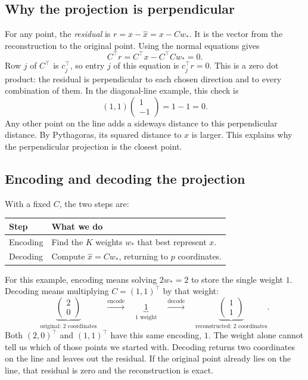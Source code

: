 \documentclass[a4paper,12pt,oneside]{report}
\begin{document}
\subsection{Why the projection is perpendicular}

For any point, the \emph{residual} is $r=x-\hat{x}=x-Cw_*$.
It is the vector from the reconstruction to the original point.
Using the normal equations gives
\[
  C^\top r=C^\top x-C^\top Cw_*=0.
\]
Row $j$ of $C^\top$ is $c_j^\top$, so entry $j$ of this equation is
$c_j^\top r=0$. This is a zero dot product: the residual is perpendicular
to each chosen direction and to every combination of them.
In the diagonal-line example, this check is
\[
  (1,1)\begin{pmatrix}1\\-1\end{pmatrix}=1-1=0.
\]
Any other point on the line adds a sideways distance to this
perpendicular distance. By Pythagoras, its squared distance to $x$
is larger. This explains why the perpendicular projection is the
closest point.

\subsection{Encoding and decoding the projection}

With a fixed $C$, the two steps are:
\begin{center}
\begin{tabularx}{\linewidth}{@{}lX@{}}
\toprule
\textbf{Step} & \textbf{What we do} \\
\midrule
Encoding & Find the $K$ weights $w_*$ that best represent $x$. \\
Decoding & Compute $\hat{x}=Cw_*$, returning to $p$ coordinates. \\
\bottomrule
\end{tabularx}
\end{center}

For this example, encoding means solving $2w_*=2$ to store the single
weight $1$. Decoding means multiplying $C=(1,1)^\top$ by that weight:
\[
  \underbrace{\begin{pmatrix}2\\0\end{pmatrix}}_{\text{original: 2 coordinates}}
  \quad\xrightarrow{\text{encode}}\quad
  \underbrace{1}_{\text{1 weight}}
  \quad\xrightarrow{\text{decode}}\quad
  \underbrace{\begin{pmatrix}1\\1\end{pmatrix}}_{\text{reconstructed: 2 coordinates}}.
\]
Both $(2,0)^\top$ and $(1,1)^\top$ have this same encoding, $1$.
The weight alone cannot tell us which of those points we started with.
Decoding returns two coordinates on the line and leaves out the residual.
If the original point already lies on the line, that residual is zero
and the reconstruction is exact.
\end{document}
